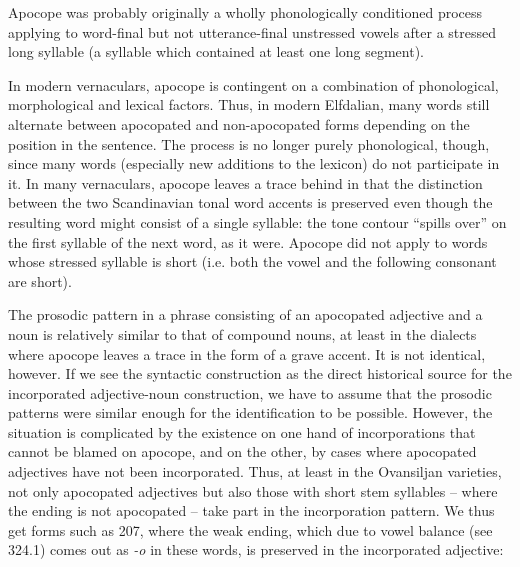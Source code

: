 \begin{styleBodytextC}
Apocope was probably originally a wholly phonologically conditioned process applying to word-final but not utterance-final unstressed vowels after a stressed long syllable (a syllable which contained at least one long segment).

\end{styleBodytextC}

\begin{styleBodytextC}
In modern vernaculars, apocope is contingent on a combination of phonological, morphological and lexical factors. Thus, in modern Elfdalian, many words still alternate between apocopated and non-apocopated forms depending on the position in the sentence. The process is no longer purely phonological, though, since many words (especially new additions to the lexicon) do not participate in it. In many vernaculars, apocope leaves a trace behind in that the distinction between the two Scandinavian tonal word accents is preserved even though the resulting word might consist of a single syllable: the tone contour “spills over” on the first syllable of the next word, as it were. Apocope did not apply to words whose stressed syllable is short (i.e. both the vowel and the following consonant are short).

\end{styleBodytextC}

\begin{styleBodytextC}
The prosodic pattern in a phrase consisting of an apocopated adjective and a noun is relatively similar to that of compound nouns, at least in the dialects where apocope leaves a trace in the form of a grave accent. It is not identical, however. If we see the syntactic construction as the direct historical source for the incorporated adjective-noun construction, we have to assume that the prosodic patterns were similar enough for the identification to be possible. However, the situation is complicated by the existence on one hand of incorporations that cannot be blamed on apocope, and on the other, by cases where apocopated adjectives have not been incorporated. Thus, at least in the Ovansiljan varieties, not only apocopated adjectives but also those with short stem syllables – where the ending is not apocopated – take part in the incorporation pattern. We thus get forms such as 207, where the weak ending, which due to vowel balance (see 324.1) comes out as\textit{ -o} in these words, is preserved in the incorporated adjective:

\end{styleBodytextC}

